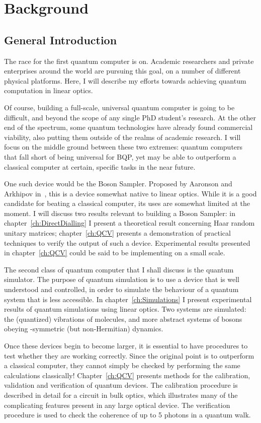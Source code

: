 \chapter{Background}
\label{ch:Introduction}
\section{General Introduction}
\label{sec:science}
The race for the first quantum computer is on. Academic researchers and private
enterprises around the world are pursuing this goal, on a number of different
physical platforms. Here, I will describe my efforts towards achieving quantum
computation in linear optics.

Of course, building a full-scale, universal quantum computer is going to be
difficult, and beyond the scope of any single PhD student's research. At the
other end of the spectrum, some quantum technologies have already found
commercial viability, also putting them outside of the realms of academic
research. I will focus on the middle ground between these two extremes: quantum
computers that fall short of being universal for BQP, yet may be able to
outperform a classical computer at certain, specific tasks in the near future.

One such device would be the Boson Sampler. Proposed by Aaronson and Arkhipov
in~\cite{bosonsampling}, this is a device somewhat native to linear optics.
While it is
a good candidate for beating a classical computer, its uses are somewhat limited
at the moment. I will discuss two results relevant to building a Boson Sampler:
in chapter~\ref{ch:DirectDialling} I present a theoretical result concerning
Haar random unitary matrices; chapter~\ref{ch:QCV} presents a demonstration of
practical techniques to verify the output of such a device. Experimental results
presented in chapter~\ref{ch:QCV} could be said to be implementing
\bosonsampling{ }on a small scale.

The second class of quantum computer that I shall discuss is the quantum
simulator. The purpose of quantum simulation is to use a device that is well
understood and controlled, in order to simulate the behaviour of a quantum
system that is less accessible. In chapter~\ref{ch:Simulations} I present
experimental results of quantum simulations using linear optics. Two systems are
simulated: the (quantized) vibrations of molecules, and more abstract systems of
bosons obeying \pt-symmetric (but non-Hermitian) dynamics.

Once these devices begin to become larger, it is essential to have procedures to
test whether they are working correctly. Since the original point is to
outperform a classical computer, they cannot simply be checked by performing the
same calculations classically! Chapter~\ref{ch:QCV} presents methods for the
calibration, validation and verification of quantum devices. The calibration
procedure is described in detail for a circuit in bulk optics, which illustrates
many of the complicating features present in any large optical device. The
verification procedure is used to check the coherence  of up to 5 photons in a quantum walk.

